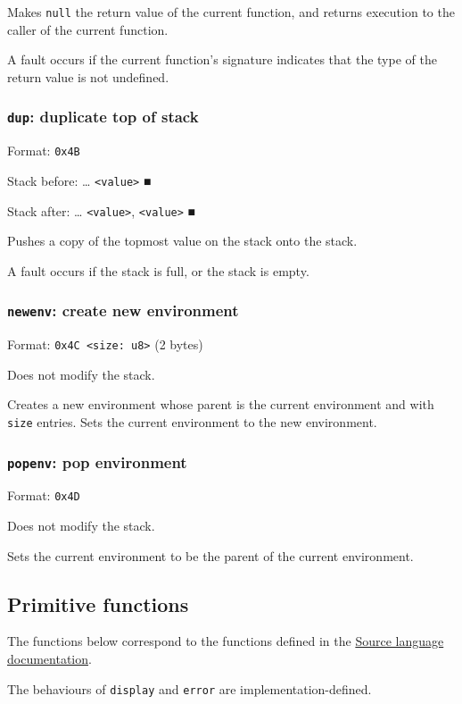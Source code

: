 \documentclass[11pt]{article}
\begin{document}
Makes \texttt{null} the return value of the current function, and returns
execution to the caller of the current function.

A fault occurs if the current function's signature indicates that the
type of the return value is not undefined.

\subsubsection{\texttt{dup}: duplicate top of stack}
\label{sec:orgde7ff7a}
Format: \texttt{0x4B}

Stack before: \ldots{}​ \texttt{<value>} ■

Stack after: \ldots{}​ \texttt{<value>}, \texttt{<value>} ■

Pushes a copy of the topmost value on the stack onto the stack.

A fault occurs if the stack is full, or the stack is empty.

\subsubsection{\texttt{newenv}: create new environment}
\label{sec:orgb7d0128}
Format: \texttt{0x4C <size: u8>} (2 bytes)

Does not modify the stack.

Creates a new environment whose parent is the current environment and
with \texttt{size} entries. Sets the current environment to the new
environment.

\subsubsection{\texttt{popenv}: pop environment}
\label{sec:org4cc850b}
Format: \texttt{0x4D}

Does not modify the stack.

Sets the current environment to be the parent of the current
environment.

\subsection{Primitive functions}
\label{sec:org22a9c67}
The functions below correspond to the functions defined in the
\href{https://sicp.comp.nus.edu.sg/source/source\_4/}{Source language
documentation}.

The behaviours of \texttt{display} and \texttt{error} are implementation-defined.
\end{document}
